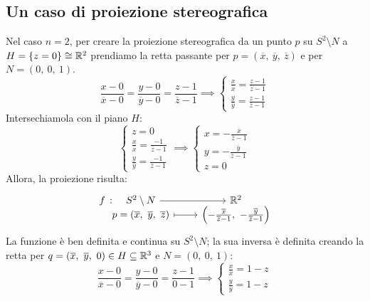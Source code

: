 \subsection{Un caso di proiezione stereografica}\label{proiezionestereograficanote}
Nel caso $n=2$, per creare la proiezione stereografica da un punto $p$ su $S^2\setminus N$ a $H=\{z=0\}\cong\mathbb{R}^2$ prendiamo la retta passante per $p=\left(\overline{x},\ \overline{y},\ \overline{z}\right)$ e per $N=\left(0,\ 0,\ 1\right)$.
\begin{equation*}
\frac{x-0}{\overline{x}-0}=\frac{y-0}{\overline{y}-0}=\frac{z-1}{\overline{z}-1}\implies
\begin{cases}
\frac{x}{\overline{x}}=\frac{z-1}{\overline{z}-1}\\
\frac{y}{\overline{y}}=\frac{z-1}{\overline{z}-1}
\end{cases}
\end{equation*}
Intersechiamola con il piano $H$:
\begin{equation*}
\begin{cases}
	z=0\\
	\frac{x}{\overline{x}}=\frac{-1}{\overline{z}-1}\\
	\frac{y}{\overline{y}}=\frac{-1}{\overline{z}-1}
\end{cases}\implies
\begin{cases}
	x=-\frac{\overline{x}}{\overline{z}-1}\\
	y=-\frac{\overline{y}}{\overline{z}-1}\\
	z=0
\end{cases}
\end{equation*}
Allora, la proiezione risulta:
\begin{equation}
	\funztot{f}{S^2\setminus N}{\realset^2}{p=\left(\overline{x},\ \overline{y},\ \overline{z}\right)}{\left(-\frac{\overline{x}}{\overline{z}-1},\ -\frac{\overline{y}}{\overline{z}-1}\right)}
\end{equation}
La funzione è ben definita e continua su $S^2\setminus N$; la sua inversa è definita creando la retta per $q=\left(\overline{x},\ \overline{y},\ 0\right)\in H\subseteq \mathbb{R}^3$ e $N=\left(0,\ 0,\ 1\right)$:
\begin{equation*}
	\frac{x-0}{\overline{x}-0}=\frac{y-0}{\overline{y}-0}=\frac{z-1}{0-1}\implies
	\begin{cases}
		\frac{x}{\overline{x}}=1-z\\
		\frac{y}{\overline{y}}=1-z
	\end{cases}
\end{equation*}
